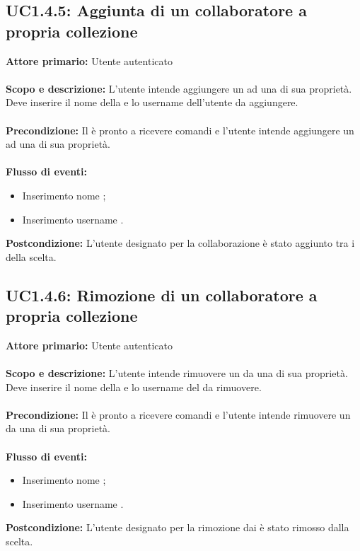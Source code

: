 \documentclass{scalatekids-article}
\begin{document}
\subsection{UC1.4.5: Aggiunta di un collaboratore a propria collezione}
\textbf{Attore primario:} Utente autenticato\\ \\
\textbf{Scopo e descrizione:} L'utente intende aggiungere un  ad una  di sua proprietà. Deve inserire il nome della  e lo username dell'utente da aggiungere.\\ \\
\textbf{Precondizione:} Il  è pronto a ricevere comandi e l'utente intende aggiungere un  ad una  di sua proprietà.\\ \\
\textbf{Flusso di eventi:}
\begin{itemize}
\item Inserimento nome ;
\item Inserimento username .
\end{itemize}
\textbf{Postcondizione:} L'utente designato per la collaborazione è stato aggiunto tra i  della  scelta.
\subsection{UC1.4.6: Rimozione di un collaboratore a propria collezione}
\textbf{Attore primario:} Utente autenticato\\ \\
\textbf{Scopo e descrizione:} L'utente intende rimuovere un  da una  di sua proprietà. Deve inserire il nome della  e lo username del  da rimuovere.\\ \\
\textbf{Precondizione:} Il  è pronto a ricevere comandi e l'utente intende rimuovere un  da una  di sua proprietà.\\ \\
\textbf{Flusso di eventi:}
\begin{itemize}
\item Inserimento nome ;
\item Inserimento username .
\end{itemize}
\textbf{Postcondizione:} L'utente designato per la rimozione dai  è stato rimosso dalla  scelta.
\end{document}

